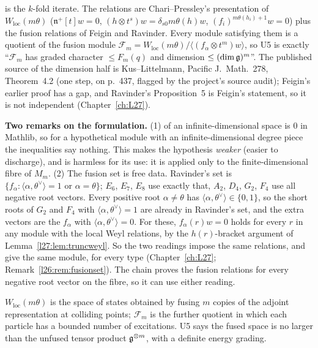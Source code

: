 \begin{dictionary}
 is the $k$-fold iterate. The relations are Chari--Pressley's presentation of
$W_{\mathrm{loc}}(m\theta)$ ($\mathfrak n^+[t]w=0$, $(h\otimes t^s)w=\delta_{s0}m\theta(h)w$,
$(f_i)^{m\theta(h_i)+1}w=0$) plus the fusion relations of Feigin and Ravinder. Every module satisfying them is a
quotient of the fusion module $\mathcal F_m=W_{\mathrm{loc}}(m\theta)/\langle(f_\alpha\otimes t^m)w\rangle$, so U5 is exactly ``$\mathcal F_m$ has graded
character $\le F_m(q)$ and dimension $\le(\dim\mathfrak g)^m$''. The published source of the dimension half is
Kus--Littelmann, Pacific J.\ Math.\ 278, Theorem~4.2 (one step, on p.~437, flagged by the project's source audit);
Feigin's earlier proof has a gap, and Ravinder's Proposition~5 is Feigin's statement, so it is not independent
(Chapter~\ref{ch:L27}).

\textbf{Two remarks on the formulation.} (1)  of an infinite-dimensional space is $0$ in
Mathlib, so for a hypothetical module with an infinite-dimensional degree piece the inequalities say nothing. This
makes the hypothesis \emph{weaker} (easier to discharge), and is harmless for its use: it is applied only to the
finite-dimensional fibre of $M_m$. (2) The fusion set is free data. Ravinder's set is
$\{f_\alpha:\langle\alpha,\theta^\vee\rangle=1\text{ or }\alpha=\theta\}$; $E_6$, $E_7$, $E_8$ use exactly that, $A_2$, $D_4$,
$G_2$, $F_4$ use all negative root vectors. Every positive root $\alpha\neq\theta$ has
$\langle\alpha,\theta^\vee\rangle\in\{0,1\}$, so the short roots of $G_2$ and $F_4$ with $\langle\alpha,\theta^\vee\rangle=1$ are
already in Ravinder's set, and the extra vectors are the $f_\alpha$ with $\langle\alpha,\theta^\vee\rangle=0$. For these,
$f_\alpha(r)w=0$ holds for every $r$ in any module with the local Weyl relations, by the $h(r)$-bracket argument of
Lemma~\ref{l27:lem:truncweyl}. So the two readings impose the same relations, and give the same module, for every type
(Chapter~\ref{ch:L27}; Remark~\ref{l26:rem:fusionset}). The chain proves the fusion
relations for every negative root vector on the fibre, so it can use either reading.
\end{dictionary}

\begin{physics}
$W_{\mathrm{loc}}(m\theta)$ is the space of states obtained by fusing $m$ copies of the adjoint representation at
colliding points; $\mathcal F_m$ is the further quotient in which each particle has a bounded number of excitations. U5 says
the fused space is no larger than the unfused tensor product $\mathfrak g^{\otimes m}$, with a definite energy grading.
\end{physics}

